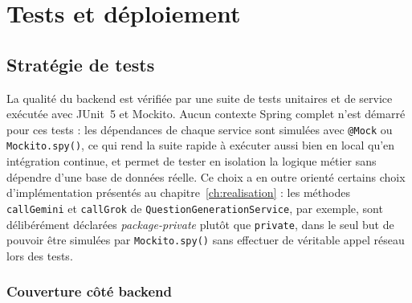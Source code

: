 \chapter{Tests et déploiement}
\label{ch:tests-deploiement}

\section{Stratégie de tests}

La qualité du backend est vérifiée par une suite de tests unitaires et de
service exécutée avec JUnit~5 et Mockito. Aucun contexte Spring complet
n'est démarré pour ces tests : les dépendances de chaque service sont
simulées avec \texttt{@Mock} ou \texttt{Mockito.spy()}, ce qui rend la
suite rapide à exécuter aussi bien en local qu'en intégration continue, et
permet de tester en isolation la logique métier sans dépendre d'une base
de données réelle. Ce choix a en outre orienté certains choix
d'implémentation présentés au chapitre~\ref{ch:realisation} : les méthodes
\texttt{callGemini} et \texttt{callGrok} de
\texttt{QuestionGenerationService}, par exemple, sont délibérément
déclarées \emph{package-private} plutôt que \texttt{private}, dans le seul
but de pouvoir être simulées par \texttt{Mockito.spy()} sans effectuer de
véritable appel réseau lors des tests.

\subsection{Couverture côté backend}

